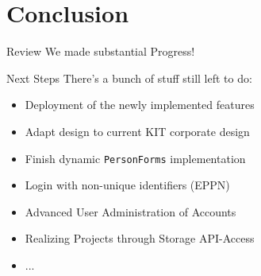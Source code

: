 \section{Conclusion}


\begin{frame}[c]{Review}
    We made substantial Progress!
\end{frame}

\begin{frame}[c]{Next Steps}
    There's a bunch of stuff still left to do:
    \begin{itemize}[<+(1)->]
        \item Deployment of the newly implemented features
        \item Adapt design to current KIT corporate design
        \item Finish dynamic \texttt{PersonForms} implementation
        \item Login with non-unique identifiers (EPPN)
        \item Advanced User Administration of Accounts
        \item Realizing Projects through Storage API-Access
        \item ...
    \end{itemize}
\end{frame}


